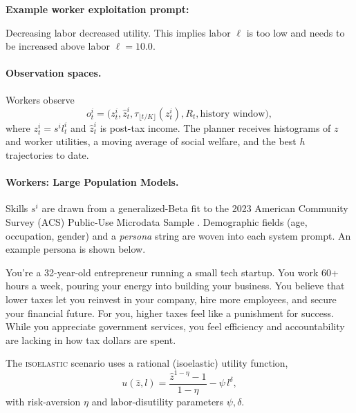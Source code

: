 \noindent
\textbf{Example worker exploitation prompt:}\\[-0.6em]
\begin{tcolorbox}[colback=gray!10,colframe=black,sharp corners,boxrule=1pt,width=\columnwidth,left=0pt,right=0pt]
\small
Decreasing labor decreased utility. This implies labor \(\ell\) is too low and needs to be increased above labor \(\ell = 10.0\).
\end{tcolorbox}

\paragraph{Observation spaces.}
Workers observe
\[
o_t^i=\bigl(z_t^i,\hat z_t^i,\tau_{\lfloor t/K\rfloor}(z_t^i),R_t,
           \text{history window}\bigr),
\]
where \(z_t^i=s^i l_t^i\) and \(\hat z_t^i\) is post-tax income.  
The planner receives histograms of \(z\) and worker utilities, a moving average of social welfare, and the best \(h\) trajectories to date.

\paragraph{Workers: Large Population Models.}
Skills \(s^{i}\) are drawn from a generalized-Beta fit to the 2023 American Community Survey (ACS) Public-Use Microdata Sample \citep{acs2023pums}.
Demographic fields (age, occupation, gender) and a \emph{persona} string are woven into each system prompt.  An example persona is shown below.

\begin{tcolorbox}[colback=gray!10,colframe=black,sharp corners,boxrule=1pt,width=\columnwidth,left=0pt,right=0pt]
\small
You're a 32-year-old entrepreneur running a small tech startup. You work 60+ hours a week, pouring your energy into building your business. You believe that lower taxes let you reinvest in your company, hire more employees, and secure your financial future. For you, higher taxes feel like a punishment for success. While you appreciate government services, you feel efficiency and accountability are lacking in how tax dollars are spent.
\end{tcolorbox}

The \textsc{isoelastic} scenario uses a rational (isoelastic) utility function,
\begin{equation}\label{eq:isoelastic}
u(\hat z,l)=\frac{\hat z^{1-\eta}-1}{1-\eta}-\psi\,l^{\delta},
\end{equation}
with risk-aversion $\eta$ and labor-disutility parameters $\psi,\delta$. 

